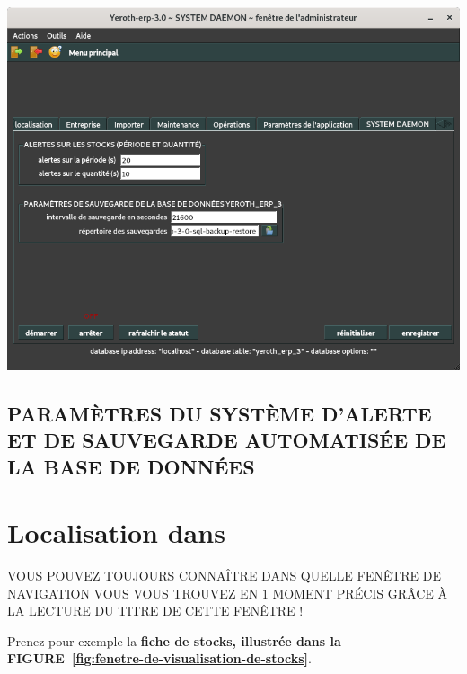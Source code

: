 \begin{center}
\includegraphics[scale=0.52]{images/yeroth-erp-3-0-system-daemon-parameters.png}
\label{fig:fenetre-de-visualisation-de-stocks}
\end{center}


\newpage


\subsection{PARAMÈTRES DU SYSTÈME D'ALERTE ET DE SAUVEGARDE AUTOMATISÉE DE LA
			BASE DE DONNÉES}


\newpage


\section{Localisation dans \yerothpgiblack}

VOUS POUVEZ TOUJOURS CONNAÎTRE DANS QUELLE FEN\^ETRE
DE NAVIGATION VOUS VOUS TROUVEZ EN $1$ MOMENT PR\'ECIS
GRÂCE \`A LA LECTURE DU TITRE DE CETTE FEN\^ETRE !

Prenez pour exemple la \textbf{fiche de stocks, illustr\'ee
dans la FIGURE~\ref{fig:fenetre-de-visualisation-de-stocks}}.





